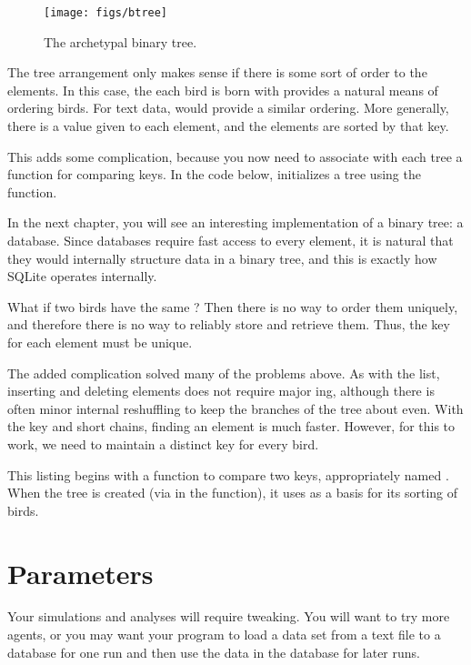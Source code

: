 \begin{figure}[htb]
\begin{center}
\texttt{[image: figs/btree]}
\end{center}
\caption{The archetypal binary tree.}
\label{btreefig}
\end{figure}

The tree arrangement only makes sense if there is some sort of order to
the elements. In this case, the  each bird is born with provides
a natural means of ordering birds. For text data,  would
provide a similar ordering. More generally, there is a  value given
to each element, and the elements are sorted by that key.

This adds some complication, because you now need to associate with each
tree a function for comparing keys. In the code below, 
initializes a tree using the  function.

In the next chapter, you will see an interesting implementation of a binary
tree: a database. Since databases require fast access to every element, 
it is natural that they would internally structure data in a binary
tree, and this is exactly how SQLite operates internally.

What if two birds have the same ? Then there is no way to order
them uniquely, and therefore there is no way to reliably store and
retrieve them. Thus, the key for each element must be unique.

The added complication solved many of the problems above. As with the
list, inserting and deleting elements does not require major
ing, although there is often minor internal reshuffling to
keep the branches of the tree about even.
With the key and short chains, finding an element is much faster.
However, for this to work, we need to maintain a distinct key for every
bird.

This listing begins with a function to compare two keys, appropriately
named . When the tree
is created (via  in the  function), it
uses  as a basis for its sorting of birds.



\section{Parameters} \label{paramsec}
Your simulations and analyses will require
tweaking. You will want to try more agents, or you may want your program
to load a data set from a text file to a database for one run and then
use the data in the database for later runs.

